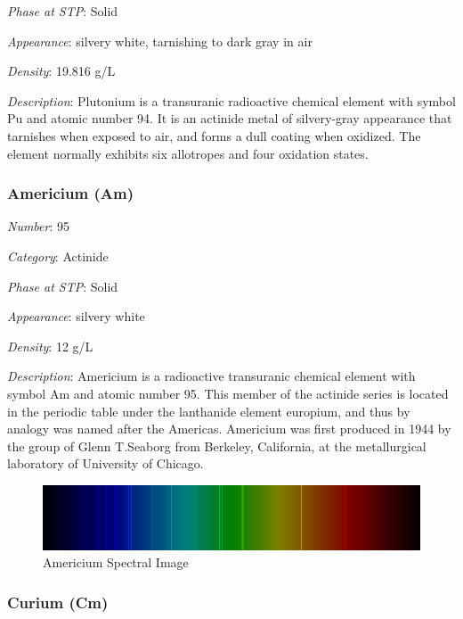 \documentclass{article}
\begin{document}
\textit{Phase at STP}: Solid

\textit{Appearance}: silvery white, tarnishing to dark gray in air

\textit{Density}: 19.816 g/L

\textit{Description}: Plutonium is a transuranic radioactive chemical element with symbol Pu and atomic number 94. It is an actinide metal of silvery-gray appearance that tarnishes when exposed to air, and forms a dull coating when oxidized. The element normally exhibits six allotropes and four oxidation states.

\hypertarget{subsubsection::Am}{}\subsubsection{Americium (Am)}

\textit{Number}: 95

\textit{Category}: Actinide

\textit{Phase at STP}: Solid

\textit{Appearance}: silvery white

\textit{Density}: 12 g/L

\textit{Description}: Americium is a radioactive transuranic chemical element with symbol Am and atomic number 95. This member of the actinide series is located in the periodic table under the lanthanide element europium, and thus by analogy was named after the Americas. Americium was first produced in 1944 by the group of Glenn T.Seaborg from Berkeley, California, at the metallurgical laboratory of University of Chicago.

\immediate{}
\begin{figure}[!ht]
    \centering
    \includegraphics[width=12cm]{./resources/spectral_img/Americium_spectrum_visible.png}
    \caption{Americium Spectral Image}
\end{figure}

\hypertarget{subsubsection::Cm}{}\subsubsection{Curium (Cm)}
\end{document}
